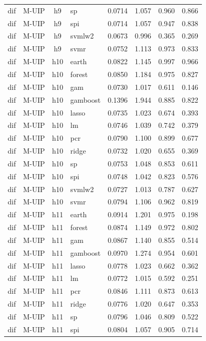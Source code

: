 \begin{ThreePartTable}
\begin{longtable}[t]{llclcccc}
dif & M-UIP & h9 & sp & 0.0714 & 1.057 & 0.960 & 0.866\\
dif & M-UIP & h9 & spi & 0.0714 & 1.057 & 0.947 & 0.838\\
dif & M-UIP & h9 & svmlw2 & 0.0673 & 0.996 & 0.365 & 0.269\\
dif & M-UIP & h9 & svmr & 0.0752 & 1.113 & 0.973 & 0.833\\
\addlinespace
dif & M-UIP & h10 & earth & 0.0822 & 1.145 & 0.997 & 0.966\\
dif & M-UIP & h10 & forest & 0.0850 & 1.184 & 0.975 & 0.827\\
dif & M-UIP & h10 & gam & 0.0730 & 1.017 & 0.611 & 0.146\\
dif & M-UIP & h10 & gamboost & 0.1396 & 1.944 & 0.885 & 0.822\\
dif & M-UIP & h10 & lasso & 0.0735 & 1.023 & 0.674 & 0.393\\
dif & M-UIP & h10 & lm & 0.0746 & 1.039 & 0.742 & 0.379\\
dif & M-UIP & h10 & pcr & 0.0790 & 1.100 & 0.899 & 0.677\\
dif & M-UIP & h10 & ridge & 0.0732 & 1.020 & 0.655 & 0.369\\
dif & M-UIP & h10 & sp & 0.0753 & 1.048 & 0.853 & 0.611\\
dif & M-UIP & h10 & spi & 0.0748 & 1.042 & 0.823 & 0.576\\
dif & M-UIP & h10 & svmlw2 & 0.0727 & 1.013 & 0.787 & 0.627\\
dif & M-UIP & h10 & svmr & 0.0794 & 1.106 & 0.962 & 0.819\\
\addlinespace
dif & M-UIP & h11 & earth & 0.0914 & 1.201 & 0.975 & 0.198\\
dif & M-UIP & h11 & forest & 0.0874 & 1.149 & 0.972 & 0.802\\
dif & M-UIP & h11 & gam & 0.0867 & 1.140 & 0.855 & 0.514\\
dif & M-UIP & h11 & gamboost & 0.0970 & 1.274 & 0.954 & 0.601\\
dif & M-UIP & h11 & lasso & 0.0778 & 1.023 & 0.662 & 0.362\\
dif & M-UIP & h11 & lm & 0.0772 & 1.015 & 0.592 & 0.251\\
dif & M-UIP & h11 & pcr & 0.0846 & 1.111 & 0.873 & 0.613\\
dif & M-UIP & h11 & ridge & 0.0776 & 1.020 & 0.647 & 0.353\\
dif & M-UIP & h11 & sp & 0.0796 & 1.046 & 0.809 & 0.522\\
dif & M-UIP & h11 & spi & 0.0804 & 1.057 & 0.905 & 0.714\\

\end{longtable}
\end{ThreePartTable}

